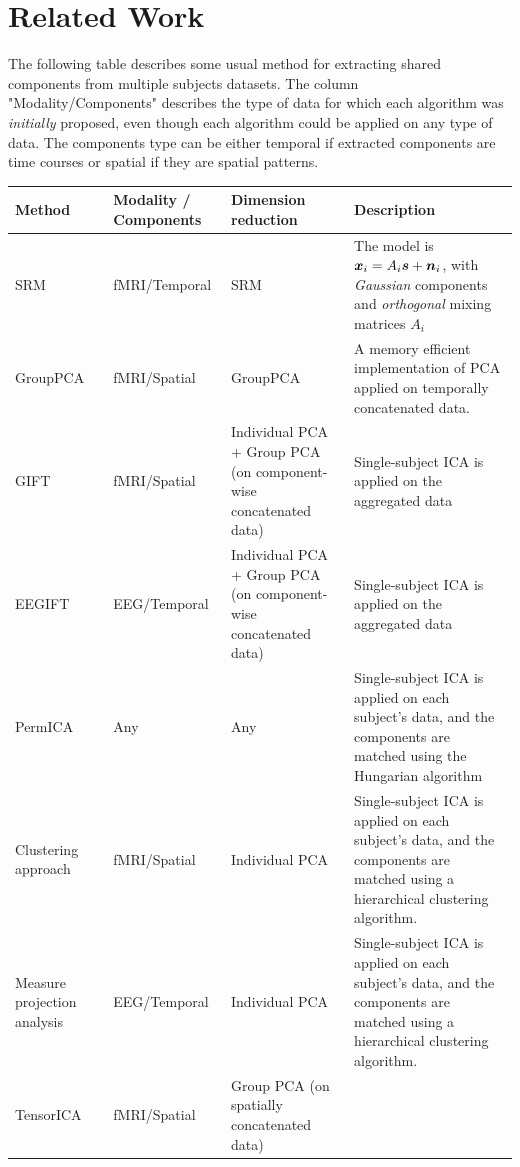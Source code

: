 \section{Related Work}
\label{sec:app_rel_work}
The following table describes some usual method for extracting shared components from multiple subjects datasets.
The column "Modality/Components" describes the type of data for which each algorithm was \emph{initially} proposed, even though each algorithm could be applied on any type of data. 
%
The components type can be either temporal if extracted components are time courses or spatial if they are spatial patterns. 
%
\begin{center}
\begin{longtable}{ |p{} | p{} |p{}| p{}|}
\hline
\textbf{Method} & \textbf{Modality / Components} &\textbf{Dimension reduction} & \textbf{Description}  \\
\hline
SRM \cite{chen2015reduced} & 
fMRI/Temporal
&
SRM
&
The model is $\boldsymbol{x}_i = A_i\boldsymbol{s} + \boldsymbol{n}_i$, with \emph{Gaussian} components and \emph{orthogonal} mixing matrices $A_i$\\
\hline
GroupPCA~\cite{smith2014group} &
fMRI/Spatial
&
GroupPCA
&
A memory efficient implementation of PCA applied on temporally concatenated data.\\
\hline
GIFT~ \cite{calhoun2001method} & 
fMRI/Spatial
&
Individual PCA + Group PCA (on component-wise concatenated data)
&
Single-subject ICA is applied on the aggregated data\\
\hline
EEGIFT~ \cite{eichele2011eegift} & 
EEG/Temporal
&
Individual PCA + Group PCA (on component-wise concatenated data)
&
Single-subject ICA is applied on the aggregated data\\
\hline
PermICA &
Any
&
Any
&
Single-subject ICA is applied on each subject's data, and the components are matched using the Hungarian algorithm\\
\hline
Clustering approach~\cite{esposito2005independent}&
fMRI/Spatial
&
Individual PCA
&
Single-subject ICA is applied on each subject's data, and the components are matched using a hierarchical clustering algorithm.\\
\hline
Measure projection analysis~\cite{bigdely2013measure}&
EEG/Temporal
&
Individual PCA
&
Single-subject ICA is applied on each subject's data, and the components are matched using a hierarchical clustering algorithm.\\
\hline
TensorICA \cite{beckmann2005tensorial} &
fMRI/Spatial
&
Group PCA (on spatially concatenated data)

\end{longtable}
\end{center}

